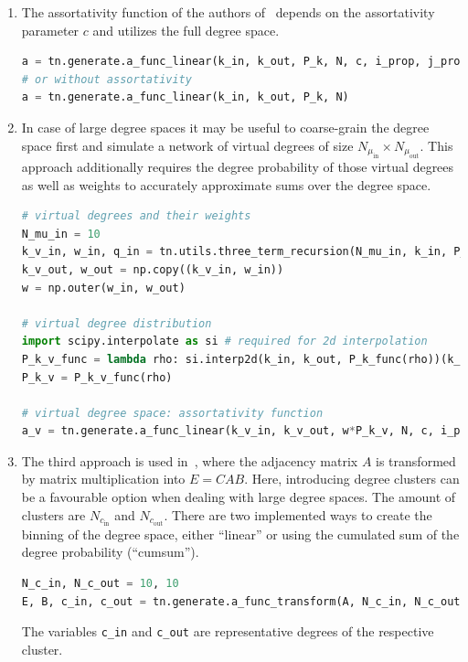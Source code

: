 \documentclass[bibliography=totoc, twoside]{article}
\numberwithin{equation}{section}
\newcommand{\inn}{\text{in}}
\newcommand{\out}{\text{out}}
\begin{document}
\begin{enumerate}
    \item The assortativity function of the authors of~\cite{chandra2017modeling} depends on the assortativity parameter $c$ and utilizes the full degree space.
\begin{lstlisting}[language=python]
a = tn.generate.a_func_linear(k_in, k_out, P_k, N, c, i_prop, j_prop)
# or without assortativity
a = tn.generate.a_func_linear(k_in, k_out, P_k, N)
\end{lstlisting}

    \item In case of large degree spaces it may be useful to coarse-grain the degree space first and simulate a network of virtual degrees of size $N_{\mu_\inn}\times N_{\mu_\out}$.
    This approach additionally requires the degree probability of those virtual degrees as well as weights to accurately approximate sums over the degree space.
\begin{lstlisting}[language=python]
# virtual degrees and their weights
N_mu_in = 10
k_v_in, w_in, q_in = tn.utils.three_term_recursion(N_mu_in, k_in, P_k_in)
k_v_out, w_out = np.copy((k_v_in, w_in))
w = np.outer(w_in, w_out)

# virtual degree distribution
import scipy.interpolate as si # required for 2d interpolation
P_k_v_func = lambda rho: si.interp2d(k_in, k_out, P_k_func(rho))(k_v_in, k_v_out)
P_k_v = P_k_v_func(rho)

# virtual degree space: assortativity function
a_v = tn.generate.a_func_linear(k_v_in, k_v_out, w*P_k_v, N, c, i_prop, j_prop)
\end{lstlisting}

    \item The third approach is used in~\cite{blasche2019}, where the adjacency matrix $A$ is transformed by matrix multiplication into $E=CAB$.
    Here, introducing degree clusters can be a favourable option when dealing with large degree spaces.
    The amount of clusters are $N_{c_\inn}$ and $N_{c_\out}$.
    There are two implemented ways to create the binning of the degree space, either ``linear'' or using the cumulated sum of the degree probability (``cumsum'').
\begin{lstlisting}[language=python]
N_c_in, N_c_out = 10, 10
E, B, c_in, c_out = tn.generate.a_func_transform(A, N_c_in, N_c_out, mapping='cumsum')
\end{lstlisting}
    The variables \texttt{c\_in} and \texttt{c\_out} are representative degrees of the respective cluster.
\end{enumerate}
\end{document}
